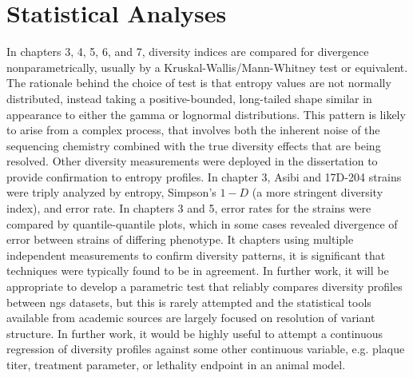 \section{Statistical Analyses}
In chapters 3, 4, 5, 6, and 7, diversity indices are compared for divergence nonparametrically, usually by a Kruskal-Wallis/Mann-Whitney test or equivalent. The rationale behind the choice of test is that entropy values are not normally distributed, instead taking a positive-bounded, long-tailed shape similar in appearance to either the gamma or lognormal distributions. This pattern is likely to arise from a complex process, that involves both the inherent noise of the sequencing chemistry combined with the true diversity effects that are being resolved. Other diversity measurements were deployed in the dissertation to provide confirmation to entropy profiles. In chapter 3, Asibi and 17D-204 strains were triply analyzed by entropy, Simpson’s $1-D$ (a more stringent diversity index), and error rate. In chapters 3 and 5, error rates for the strains were compared by quantile-quantile plots, which in some cases revealed divergence of error between strains of differing phenotype. It chapters using multiple independent measurements to confirm diversity patterns, it is significant that techniques were typically found to be in agreement. In further work, it will be appropriate to develop a parametric test that reliably compares diversity profiles between \gls{ngs} datasets, but this is rarely attempted and the statistical tools available from academic sources are largely focused on resolution of variant structure. In further work, it would be highly useful to attempt a continuous regression of diversity profiles against some other continuous variable, e.g. plaque titer, treatment parameter, or lethality endpoint in an animal model. 
